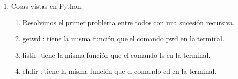 \documentclass{article}
\begin{document}
\begin{enumerate}
\begin{enumerate}
\begin{enumerate}
			\end{enumerate}
		\end{enumerate}
	\item Cosas vistas en Python:
	\begin{enumerate}
		\item Resolvimos el primer problema entre todos con una sucesión recursiva.
		\item getwd : tiene la misma función que el comando pwd en la terminal.
		\item listir :tiene la misma función que el comando ls en la terminal.
		\item chdir : tiene la misma función que el comando cd en la terminal.
	\end{enumerate}
	\end{enumerate}
\end{document}
